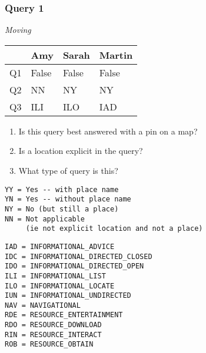 
\begin{frame}[fragile]
\frametitle{Query 1}
\vspace{1em}

\emph{Moving}

\vfill

\begin{table}
  \centering
  \begin{tabular}{ l l l l }
    & \textbf{Amy} & \textbf{Sarah} & \textbf{Martin}\\
    \toprule
    Q1 & False & False & False\\
Q2 & NN & NY & NY\\
Q3 & ILI & ILO & IAD\\
    \bottomrule
  \end{tabular}
\end{table}

\vfill

\tiny{

\begin{enumerate}
\item Is this query best answered with a pin on a map?
\item Is a location explicit in the query?
\item What type of query is this?
\end{enumerate}

\vfill

\begin{multicols}{2}
\begin{verbatim}
YY = Yes -- with place name
YN = Yes -- without place name
NY = No (but still a place)
NN = Not applicable 
     (ie not explicit location and not a place)
\end{verbatim}

\columnbreak
\begin{verbatim}
IAD = INFORMATIONAL_ADVICE
IDC = INFORMATIONAL_DIRECTED_CLOSED
IDO = INFORMATIONAL_DIRECTED_OPEN
ILI = INFORMATIONAL_LIST
ILO = INFORMATIONAL_LOCATE
IUN = INFORMATIONAL_UNDIRECTED
NAV = NAVIGATIONAL
RDE = RESOURCE_ENTERTAINMENT
RDO = RESOURCE_DOWNLOAD
RIN = RESOURCE_INTERACT
ROB = RESOURCE_OBTAIN
\end{verbatim}
\end{multicols}
}

\end{frame}


